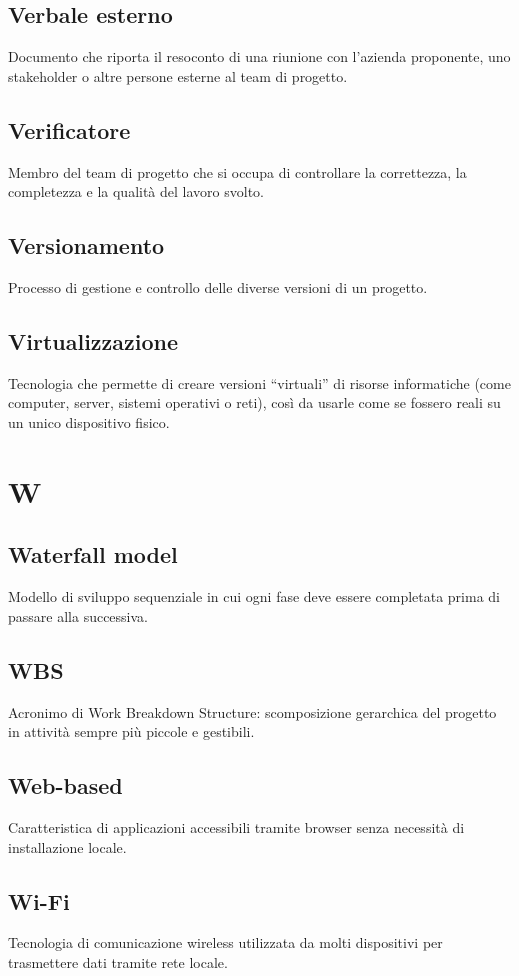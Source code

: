 \documentclass[a4paper,12pt]{article}
\begin{document}
          \subsection*{Verbale esterno}
			Documento che riporta il resoconto di una riunione con l'azienda proponente, uno stakeholder o altre persone esterne al team di progetto.
          \subsection*{Verificatore}
			Membro del team di progetto che si occupa di controllare la correttezza, la completezza e la qualità del lavoro svolto.
          \subsection*{Versionamento}
			Processo di gestione e controllo delle diverse versioni di un progetto.
          \subsection*{Virtualizzazione}
            Tecnologia che permette di creare versioni “virtuali” di risorse informatiche (come computer, server, sistemi operativi o reti), così da usarle come se fossero reali su un unico dispositivo fisico.
        
\newpage
        \section{W}
        
          \subsection*{Waterfall model}
			Modello di sviluppo sequenziale in cui ogni fase deve essere completata prima di passare alla successiva.
          \subsection*{WBS}
			Acronimo di Work Breakdown Structure: scomposizione gerarchica del progetto in attività sempre più piccole e gestibili. 
          \subsection*{Web-based}
			Caratteristica di applicazioni accessibili tramite browser senza necessità di installazione locale.
          \subsection*{Wi-Fi}
			Tecnologia di comunicazione wireless utilizzata da molti dispositivi per trasmettere dati tramite rete locale.
\end{document}
